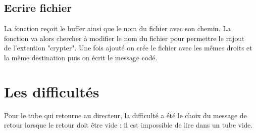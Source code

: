 \documentclass[a4]{article}
\begin{document}
\subsection{Ecrire fichier}
La fonction re\c coit le buffer ainsi que le nom du fichier avec son chemin. La fonction va alors chercher à modifier le nom du fichier pour permettre le rajout de l'extention "crypter". Une fois ajouté on crée le fichier avec les mêmes droits et la même destination puis on écrit le message codé.
\section{Les difficultés}
Pour le tube qui retourne au directeur, la difficulté a été le choix du message de retour lorsque le retour doit être vide : il est impossible de lire dans un tube vide.\newline 
\end{document}
